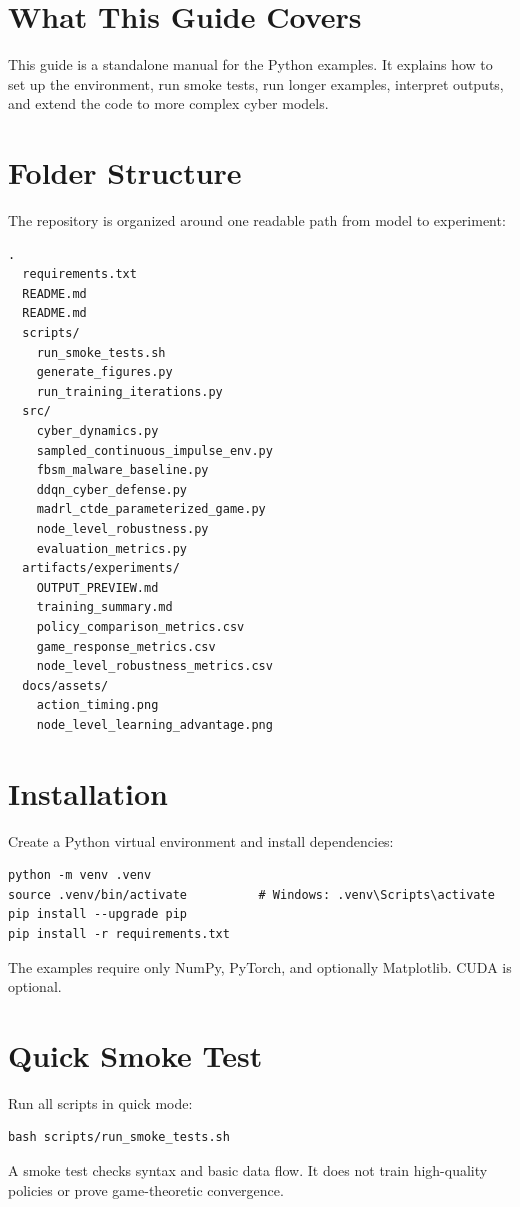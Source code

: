 \documentclass[11pt,a4paper]{article}
\begin{document}
\tableofcontents
\newpage
{}

\section{What This Guide Covers}
This guide is a standalone manual for the Python examples. It explains how to set up the environment, run smoke tests, run longer examples, interpret outputs, and extend the code to more complex cyber models.

\section{Folder Structure}
The repository is organized around one readable path from model to experiment:
\begin{verbatim}
.
  requirements.txt
  README.md
  README.md
  scripts/
    run_smoke_tests.sh
    generate_figures.py
    run_training_iterations.py
  src/
    cyber_dynamics.py
    sampled_continuous_impulse_env.py
    fbsm_malware_baseline.py
    ddqn_cyber_defense.py
    madrl_ctde_parameterized_game.py
    node_level_robustness.py
    evaluation_metrics.py
  artifacts/experiments/
    OUTPUT_PREVIEW.md
    training_summary.md
    policy_comparison_metrics.csv
    game_response_metrics.csv
    node_level_robustness_metrics.csv
  docs/assets/
    action_timing.png
    node_level_learning_advantage.png
\end{verbatim}

\section{Installation}
Create a Python virtual environment and install dependencies:
\begin{lstlisting}[style=pythonstyle]
python -m venv .venv
source .venv/bin/activate          # Windows: .venv\Scripts\activate
pip install --upgrade pip
pip install -r requirements.txt
\end{lstlisting}
The examples require only NumPy, PyTorch, and optionally Matplotlib. CUDA is optional.

\section{Quick Smoke Test}
Run all scripts in quick mode:
\begin{lstlisting}[style=pythonstyle]
bash scripts/run_smoke_tests.sh
\end{lstlisting}
A smoke test checks syntax and basic data flow. It does not train high-quality policies or prove game-theoretic convergence.
\end{document}
